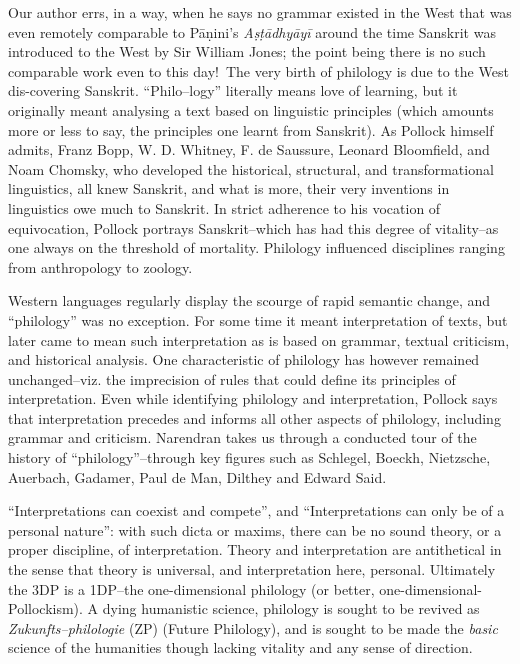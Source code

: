 Our author errs, in a way, when he says no grammar existed in the West that was even remotely comparable to Pāṇini’s \textit{Aṣṭādhyāyī} around the time Sanskrit was introduced to the West by Sir William Jones; the point being there is no such comparable work even to this day!~The very birth of philology is due to the West dis-\break covering Sanskrit. “Philo–logy” literally means love of learning, but it originally meant analysing a text based on linguistic principles (which amounts more or less to say, the principles one learnt from Sanskrit). As Pollock himself admits, Franz Bopp, W. D. Whitney, F. de Saussure, Leonard Bloomfield, and Noam Chomsky, who developed the historical, structural, and transformational linguistics, all knew Sanskrit, and what is more, their very inventions in linguistics owe much to Sanskrit. In strict adherence to his vocation of equivocation, Pollock portrays Sanskrit–which has had this degree of vitality–as one always on the threshold of mortality. Philology influenced disciplines ranging from anthropology to zoology.

Western languages regularly display the scourge of rapid semantic change, and “philology” was no exception. For some time it meant interpretation of texts, but later came to mean such interpretation as is based on grammar, textual criticism, and historical analysis. One characteristic of philology has however remained unchanged–viz. the imprecision of rules that could define its principles of interpretation. Even while identifying philology and interpretation, Pollock says that interpretation precedes and informs all other aspects of philology, including grammar and criticism. Narendran takes us through a conducted tour of the history of “philology”–through key figures such as Schlegel, Boeckh, Nietzsche, Auerbach, Gadamer, Paul de Man, Dilthey and Edward Said.

“Interpretations can coexist and compete”, and “Interpretations can only be of a personal nature”: with such dicta or maxims, there can be no sound theory, or a proper discipline, of interpretation. Theory and interpretation are antithetical in the sense that theory is universal, and interpretation here, personal. Ultimately the 3DP is a 1DP–the one-dimensional philology (or better, one-dimensional-Pollockism). A dying humanistic science, philology is sought to be revived as \textit{Zukunfts–philologie} (ZP) (Future Philology), and is sought to be made the \textit{basic} science of the humanities though lacking vitality and any sense of direction.

